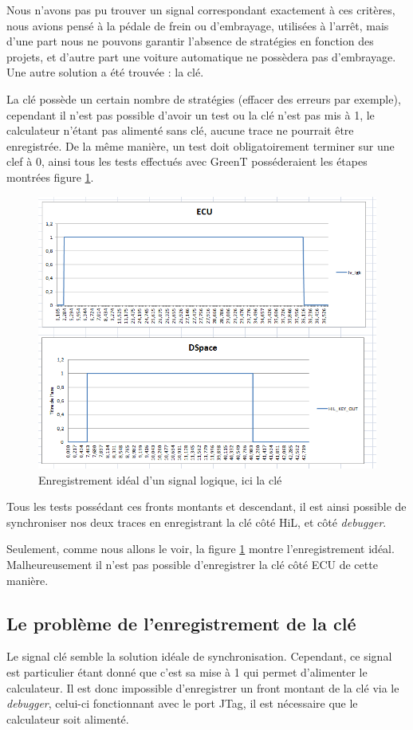 Nous n'avons pas pu trouver un signal correspondant exactement à ces critères, nous avions pensé à la pédale de frein ou d'embrayage, utilisées à l'arrêt, mais d'une part nous ne pouvons garantir l'absence de stratégies en fonction des projets, et d'autre part une voiture automatique ne possèdera pas d'embrayage. Une autre solution a été trouvée : la clé.

La clé possède un certain nombre de stratégies (effacer des erreurs par exemple), cependant il n'est pas possible d'avoir un test ou la clé n'est pas mis à 1, le calculateur n'étant pas alimenté sans clé, aucune trace ne pourrait être enregistrée. De la même manière, un test doit obligatoirement terminer sur une clef à 0, ainsi tous les tests effectués avec GreenT posséderaient les étapes montrées figure \ref{fig:testKey}. 

\begin{figure}[h]
	\centering
	\includegraphics[width=0.61\linewidth]{contents/images/sync2}
	\caption{Enregistrement idéal d'un signal logique, ici la clé}
	\label{fig:testKey}
\end{figure}


Tous les tests possédant ces fronts montants et descendant, il est ainsi possible de synchroniser nos deux traces en enregistrant la clé côté HiL, et côté \textit{debugger}. 

Seulement, comme nous allons le voir, la figure \ref{fig:testKey} montre l'enregistrement idéal. Malheureusement il n'est pas possible d'enregistrer la clé côté ECU de cette manière.

\subsection{Le problème de l'enregistrement de la clé}
Le signal clé semble la solution idéale de synchronisation. Cependant, ce signal est particulier étant donné que c'est sa mise à 1 qui permet d'alimenter le calculateur. Il est donc impossible d'enregistrer un front montant de la clé via le \textit{debugger}, celui-ci fonctionnant avec le port JTag, il est nécessaire que le calculateur soit alimenté. 

